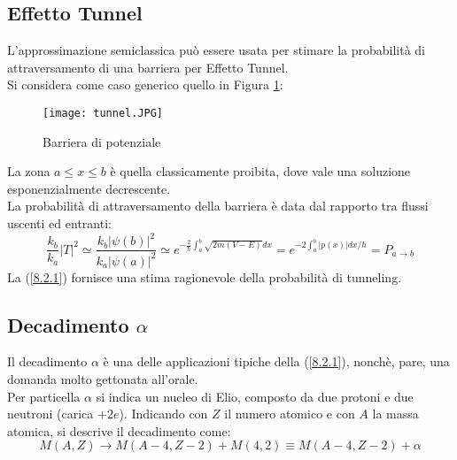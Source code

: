 \documentclass[twoside]{article}
\begin{document}
\vspace{3 cm}


\subsection{Effetto Tunnel}

L'approssimazione semiclassica può essere usata per stimare la probabilità di attraversamento di una barriera per Effetto Tunnel.
\\
Si considera come caso generico quello in Figura \ref{tunnel}:

\begin{figure}[ht]
\centering
\texttt{[image: tunnel.JPG]}
\caption{Barriera di potenziale}
\label{tunnel}
\end{figure}

La zona $a\leq x\leq b$ è quella classicamente proibita, dove vale una soluzione esponenzialmente decrescente.
\\
La probabilità di attraversamento della barriera è data dal rapporto tra flussi uscenti ed entranti:
\begin{equation} \label{8.2.1}
    \frac{k_b}{k_a}|T|^2\simeq \frac{k_b|\psi(b)|^2}{k_a|\psi(a)|^2}\simeq e^{-\frac{2}{\hbar}\int_a ^b \sqrt{2m(V-E)}dx}=e^{-2\int_a ^b |p(x)| dx/\hbar}=P_{a \rightarrow b}
\end{equation}
La (\ref{8.2.1}) fornisce una stima ragionevole della probabilità di tunneling.

\vspace{0.5cm}

\subsection{Decadimento \texorpdfstring{$\alpha$}{Lg}}
Il decadimento $\alpha$ è una delle applicazioni tipiche della (\ref{8.2.1}), nonchè, pare, una domanda molto gettonata all'orale.
\\
Per particella $\alpha$ si indica un nucleo di Elio, composto da due protoni e due neutroni (carica $+2e$). Indicando con $Z$ il numero atomico e con $A$ la massa atomica, si descrive il decadimento come:
\begin{equation}
    M(A,Z) \rightarrow M(A-4,Z-2)+M(4,2)\equiv M(A-4,Z-2)+\alpha
\end{equation}
\end{document}

